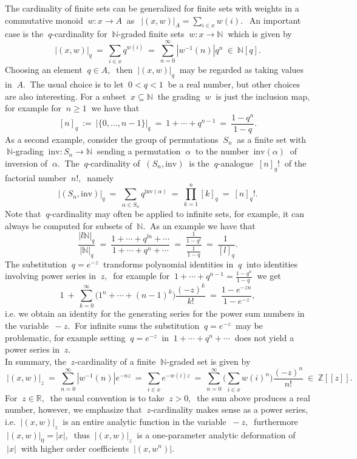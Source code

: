 \documentclass[10pt,leqeq]{article}
\begin{document}
The cardinality of finite sets can be generalized for finite sets with weights in a commutative monoid $ \ w:x\rightarrow A\ $ as 
$\ \ |(x,w)|_A=\sum_{i\in x}w(i). \ \ $ An important case is
the $\ q$-cardinality for $\ \mathbb{N} $-graded finite sets $\ w:x\rightarrow \mathbb{N} \ $ which is given by 
$$\ |(x,w)|_q\ = \ \sum_{i\in x}q^{w(i)}\ = \ \sum_{n=0}^{\infty}|w^{-1}(n)|q^n \  \in \ \mathbb{N}[q].\ $$
Choosing an element $\ q\in A, \ $ then $\ |(x,w)|_q \ $ may be regarded as taking values in $ \ A. \ $ The usual choice is to let $\ 0< q<1 \ $ be a real number, but other choices are also interesting. 
For a subset $\ x \subseteq \mathbb{N} \ $ the grading $ \ w \ $ is just the inclusion map, for example for $\ n\geq 1 \ $ we have that
$$\ \displaystyle [n]_q\ := \ |\{0,...,n-1\}|_q\ = \ 1+\cdots +q^{n-1} \ =\ \frac{1-q^n}{1-q}. \ $$ 
As a second example, consider the group of permutations $\ S_n \ $ as a 
finite set with $\ \mathbb{N} $-grading $\ \mathrm{inv}:S_n \rightarrow \mathbb{N}\ $ sending a permutation $\ \alpha \ $ to the number 
$\ \mathrm{inv}(\alpha) \ $ of inversion of $\ \alpha. \ $ The $\ q$-cardinality of $\ (S_n, \mathrm{inv})\ $ is the $\ q$-analogue
$\ [n]_q!\ $ of the factorial number $\ n!, \ $ namely
$$|(S_n, \mathrm{inv})|_q \ = \  \sum_{\alpha \in S_n } q^{ \mathrm{inv}(\alpha)}  \ = \ \prod_{k=1}^{n}[k]_q \ = \ [n]_q!.$$
Note that $\ q$-cardinality may often be applied to infinite sets, for example, it can always be computed for subsets of $\ \mathbb{N}. \ $ As an example we have that
$$\displaystyle \frac{|l\mathbb{N}|_q}{|\mathbb{N}|_q}\ = \ \frac{1+\cdots+q^{ln}+\cdots }{1+\cdots+q^{n}+\cdots} \ = \ 
\frac{\frac{1}{1-q^l} }{\frac{1}{1-q}}\ = \ \frac{1\ }{[l]_q}.$$
The substitution $\ q=e^{-z} \ $ transforms polynomial identities in $\ q \ $
into identities involving power series in $\ z, \ $ for example for
$\ \displaystyle 1+\cdots +q^{n-1}=\frac{1-q^n}{1-q\ }\ $ we get
$$1\ +\ \sum_{k=0}^{\infty}\bigg(1^n +\cdots+(n-1)^k\bigg)\frac{(-z)^k}{k!}\ = \ \frac{1-e^{-zn}}{1-e^{-z}},$$ i.e. we obtain an identity for the generating series for the power sum numbers in the variable $\ -z. \ $ For infinite sums the substitution $\ q=e^{-z} \ $ may be problematic, for example setting $\ q=e^{-z} \ $  in  
$ \ 1+\cdots+q^{n}+\cdots\ $ does not yield a power series in  $\ z. $ \\

In summary, the $\ z$-cardinality of a finite 
$\ \mathbb{N}$-graded set is given by
$$\ |(x,w)|_z \ = \ 
\sum_{n=0}^{\infty}|w^{-1}(n)|e^{-nz} \ = \  
\sum_{i\in x}e^{-w(i)z}\ = \ \sum_{n=0}^{\infty}\bigg(\sum_{i\in x}w(i)^n \bigg)\frac{(-z)^n}{n!}  \  \in \ \mathbb{Z}[[z]].$$ For 
$\ z\in \mathbb{R}, \ $ the usual convention is to take $\ z>0,\ $ the sum above produces a real number, however, we emphasize that $\ z$-cardinality makes sense as a power series, i.e. $\ |(x,w)|_z\ $ is an entire analytic function in the variable $\ -z, \ $  furthermore $\ |(x,w)|_0= |x|,\ $ thus  $\ |(x,w)|_z\ $ is a one-parameter analytic deformation of  $\ |x| \ $ with higher order coefficients   $\ |(x,w^n)|.\ $  \\
\end{document}
